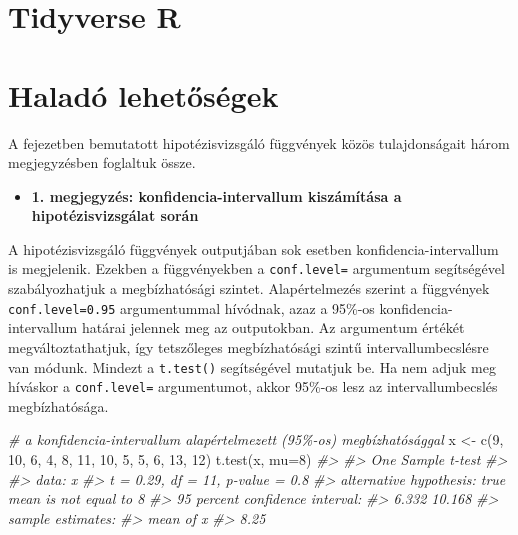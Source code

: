 \documentclass[
]{book}
\newenvironment{Shaded}{\begin{snugshade}}{\end{snugshade}}
\newcommand{\AttributeTok}[1]{\textcolor[rgb]{0.77,0.63,0.00}{#1}}
\newcommand{\CommentTok}[1]{\textcolor[rgb]{0.56,0.35,0.01}{\textit{#1}}}
\newcommand{\DecValTok}[1]{\textcolor[rgb]{0.00,0.00,0.81}{#1}}
\newcommand{\FunctionTok}[1]{\textcolor[rgb]{0.00,0.00,0.00}{#1}}
\newcommand{\NormalTok}[1]{#1}
\newcommand{\OtherTok}[1]{\textcolor[rgb]{0.56,0.35,0.01}{#1}}
\providecommand{\tightlist}{%
  \setlength{\itemsep}{0pt}\setlength{\parskip}{0pt}}
\begin{document}
\hypertarget{tidyverse-r}{%
\section{Tidyverse R}\label{tidyverse-r}}

\hypertarget{haladuxf3-lehetux151suxe9gek-1}{%
\section{Haladó lehetőségek}\label{haladuxf3-lehetux151suxe9gek-1}}

A fejezetben bemutatott hipotézisvizsgáló függvények közös tulajdonságait három megjegyzésben foglaltuk össze.

\begin{itemize}
\tightlist
\item
  \textbf{1. megjegyzés: konfidencia-intervallum kiszámítása a hipotézisvizsgálat során}
\end{itemize}

A hipotézisvizsgáló függvények outputjában sok esetben konfidencia-intervallum is megjelenik. Ezekben a függvényekben a \texttt{conf.level=} argumentum segítségével szabályozhatjuk a megbízhatósági szintet. Alapértelmezés szerint a függvények \texttt{conf.level=0.95} argumentummal hívódnak, azaz a 95\%-os konfidencia-intervallum határai jelennek meg az outputokban. Az argumentum értékét megváltoztathatjuk, így tetszőleges megbízhatósági szintű intervallumbecslésre van módunk. Mindezt a \texttt{t.test()} segítségével mutatjuk be. Ha nem adjuk meg híváskor a \texttt{conf.level=} argumentumot, akkor 95\%-os lesz az intervallumbecslés megbízhatósága.

\begin{Shaded}
\begin{Highlighting}[]
\CommentTok{\# a konfidencia{-}intervallum alapértelmezett (95\%{-}os) megbízhatósággal}
\NormalTok{x }\OtherTok{\textless{}{-}} \FunctionTok{c}\NormalTok{(}\DecValTok{9}\NormalTok{, }\DecValTok{10}\NormalTok{, }\DecValTok{6}\NormalTok{, }\DecValTok{4}\NormalTok{, }\DecValTok{8}\NormalTok{, }\DecValTok{11}\NormalTok{, }\DecValTok{10}\NormalTok{, }\DecValTok{5}\NormalTok{, }\DecValTok{5}\NormalTok{, }\DecValTok{6}\NormalTok{, }\DecValTok{13}\NormalTok{, }\DecValTok{12}\NormalTok{)}
\FunctionTok{t.test}\NormalTok{(x, }\AttributeTok{mu=}\DecValTok{8}\NormalTok{)  }
\CommentTok{\#\textgreater{} }
\CommentTok{\#\textgreater{}  One Sample t{-}test}
\CommentTok{\#\textgreater{} }
\CommentTok{\#\textgreater{} data:  x}
\CommentTok{\#\textgreater{} t = 0.29, df = 11, p{-}value = 0.8}
\CommentTok{\#\textgreater{} alternative hypothesis: true mean is not equal to 8}
\CommentTok{\#\textgreater{} 95 percent confidence interval:}
\CommentTok{\#\textgreater{}   6.332 10.168}
\CommentTok{\#\textgreater{} sample estimates:}
\CommentTok{\#\textgreater{} mean of x }
\CommentTok{\#\textgreater{}      8.25}
\end{Highlighting}
\end{Shaded}
\end{document}
